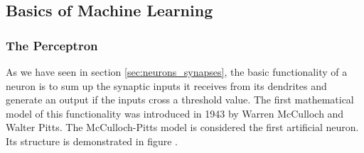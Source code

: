 \subsection{Basics of Machine Learning}

\subsubsection{The Perceptron}\label{sec:perceptron}

As we have seen in section \ref{sec:neurons_synapses}, the basic functionality of a neuron is to sum up the synaptic inputs it receives from its dendrites and generate an output if the inputs cross a threshold value. The first mathematical model of this functionality was introduced in 1943 by Warren McCulloch and Walter Pitts. The McCulloch-Pitts model is considered the first artificial neuron. Its structure is demonstrated in figure . 


